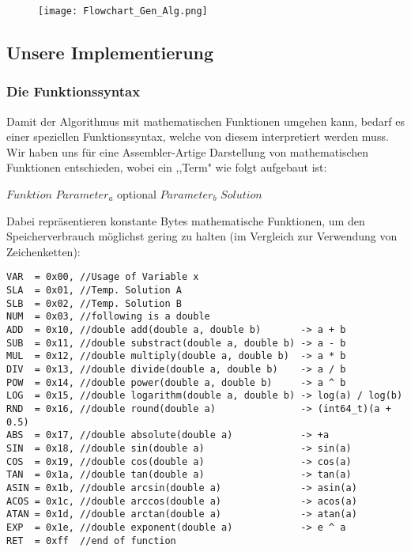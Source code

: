\documentclass[a4paper,12pt]{article}
\begin{document}
\begin{figure}[H]
\texttt{[image: Flowchart\_Gen\_Alg.png]}
\end{figure}

\subsection{Unsere Implementierung}
\subsubsection{Die Funktionssyntax}
Damit der Algorithmus mit mathematischen Funktionen umgehen kann, bedarf es einer speziellen Funktionssyntax, welche von diesem interpretiert werden muss.\\
Wir haben uns für eine Assembler-Artige Darstellung von mathematischen Funktionen entschieden, wobei ein ,,Term" wie folgt aufgebaut ist:
\indent \begin{center}
$Funktion$ $Parameter_a$ optional $Parameter_b$ $Solution$\\
\end{center}
Dabei repräsentieren konstante Bytes mathematische Funktionen, um den Speicherverbrauch möglichst gering zu halten (im Vergleich zur Verwendung von Zeichenketten):

\begin{verbatim}
VAR  = 0x00, //Usage of Variable x
SLA  = 0x01, //Temp. Solution A
SLB  = 0x02, //Temp. Solution B
NUM  = 0x03, //following is a double
ADD  = 0x10, //double add(double a, double b)       -> a + b
SUB  = 0x11, //double substract(double a, double b) -> a - b
MUL  = 0x12, //double multiply(double a, double b)  -> a * b
DIV  = 0x13, //double divide(double a, double b)    -> a / b
POW  = 0x14, //double power(double a, double b)     -> a ^ b
LOG  = 0x15, //double logarithm(double a, double b) -> log(a) / log(b)
RND  = 0x16, //double round(double a)               -> (int64_t)(a + 0.5)
ABS  = 0x17, //double absolute(double a)            -> +a
SIN  = 0x18, //double sin(double a)                 -> sin(a)
COS  = 0x19, //double cos(double a)                 -> cos(a)
TAN  = 0x1a, //double tan(double a)                 -> tan(a)
ASIN = 0x1b, //double arcsin(double a)              -> asin(a)
ACOS = 0x1c, //double arccos(double a)              -> acos(a)
ATAN = 0x1d, //double arctan(double a)              -> atan(a)
EXP  = 0x1e, //double exponent(double a)            -> e ^ a
RET  = 0xff  //end of function
\end{verbatim}
\newpage
\end{document}

